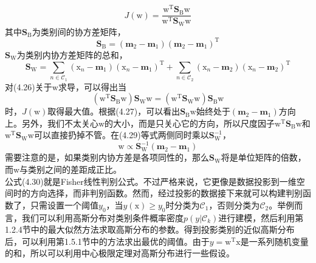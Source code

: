 \documentclass[b5paper]{book}
\numberwithin{equation}{chapter}
\newcommand {\bx} {\boldsymbol{\mathrm{x}}}
\newcommand {\bw} {\boldsymbol{\mathrm{w}}}
\newcommand {\rmT} {\mathrm{T}}
\begin{document}
{\begin{equation}
		J(\bw)=\frac{\bw^{\rmT}\mathbf{S}_\mathrm{B}\bw}{\bw^{\rmT}\mathbf{S}_\mathrm{W}\bw}
	\end{equation}
	其中$\mathbf{S}_\mathrm{B}$为类别间的协方差矩阵，
	\begin{equation}
		\mathbf{S}_\mathrm{B} = (\mathbf{m}_2 - \mathbf{m}_1)(\mathbf{m}_2 - \mathbf{m}_1)^{\rmT}
	\end{equation}
	$\mathbf{S}_\mathrm{W}$为类别内协方差矩阵的总和，
	\begin{equation}
		\mathbf{S}_\mathrm{W}=\sum_{n \in \mathcal{C}_1}(\bx_n - \mathbf{m}_1)(\bx_n - \mathbf{m}_1)^{\rmT} + \sum_{n \in \mathcal{C}_2}(\bx_n - \mathbf{m}_2)(\bx_n - \mathbf{m}_2)^{\rmT}
	\end{equation}
	对(4.26)关于$\bw$求导，可以得出当
	\begin{equation}
		(\bw^{\rmT}\mathbf{S}_\mathrm{B}\bw)\mathbf{S}_\mathrm{W}\bw = (\bw^{\rmT}\mathbf{S}_\mathrm{W}\bw)\mathbf{S}_\mathrm{B}\bw
	\end{equation}
	时，$J(\bw)$取得最大值。根据(4.27)，可以看出$\mathbf{S}_\mathrm{B}\bw$始终处于$(\mathbf{m}_2 - \mathbf{m}_1)$方向上。另外，我们不太关心$\bw$的大小，而是只关心它的方向，所以尺度因子$\bw^{\rmT}\mathbf{S}_\mathrm{B}\bw$和$\bw^{\rmT}\mathbf{S}_\mathrm{W}\bw$可以直接扔掉不管。在(4.29)等式两侧同时乘以$\mathbf{S}_\mathrm{W}^{-1}$，
	\begin{equation}
		\bw \propto \mathbf{S}_\mathrm{W}^{-1}(\mathbf{m}_2 - \mathbf{m}_1)
	\end{equation}
	需要注意的是，如果类别内协方差是各项同性的，那么$\mathbf{S}_\mathrm{W}$将是单位矩阵的倍数，而$\bw$与类别之间的差距成正比。\\
	\indent 公式(4.30)就是Fisher线性判别公式。不过严格来说，它更像是数据投影到一维空间时的方向选择，而非判别函数。然而，经过投影的数据接下来就可以构建判别函数了，只需设置一个阈值$y_0$，当$y(\bx)\geqslant y_0$时分类为$\mathcal{C}_1$，否则分类为$\mathcal{C}_2$。举例而言，我们可以利用高斯分布对类别条件概率密度$p(y|\mathcal{C}_k)$进行建模，然后利用第1.2.4节中的最大似然方法求取高斯分布的参数。得到投影类别的近似高斯分布后，可以利用第1.5.1节中的方法求出最优的阈值。由于$y=\bw^{\rmT}\bx$是一系列随机变量的和，所以可以利用中心极限定理对高斯分布进行一些假设。
	}
\end{document}
